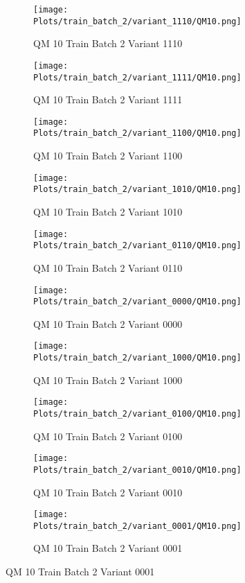\documentclass{DissertateFigs}
\begin{document}
\begin{figure}[t!]
    \begin{subfigure}{0.47\textwidth}
    \texttt{[image: Plots/train\_batch\_2/variant\_1110/QM10.png]}
    \caption{QM 10 Train Batch 2 Variant 1110}
    \end{subfigure}
    \begin{subfigure}{0.47\textwidth}
    \texttt{[image: Plots/train\_batch\_2/variant\_1111/QM10.png]}
    \caption{QM 10 Train Batch 2 Variant 1111}
    \end{subfigure}

\medskip

    \begin{subfigure}{0.47\textwidth}
    \texttt{[image: Plots/train\_batch\_2/variant\_1100/QM10.png]}
    \caption{QM 10 Train Batch 2 Variant 1100}
    \end{subfigure}
    \begin{subfigure}{0.47\textwidth}
    \texttt{[image: Plots/train\_batch\_2/variant\_1010/QM10.png]}
    \caption{QM 10 Train Batch 2 Variant 1010}
    \end{subfigure}

\medskip

    \begin{subfigure}{0.47\textwidth}
    \texttt{[image: Plots/train\_batch\_2/variant\_0110/QM10.png]}
    \caption{QM 10 Train Batch 2 Variant 0110}
    \end{subfigure}
    \begin{subfigure}{0.47\textwidth}
    \texttt{[image: Plots/train\_batch\_2/variant\_0000/QM10.png]}
    \caption{QM 10 Train Batch 2 Variant 0000}
    \end{subfigure}

\medskip

    \begin{subfigure}{0.47\textwidth}
    \texttt{[image: Plots/train\_batch\_2/variant\_1000/QM10.png]}
    \caption{QM 10 Train Batch 2 Variant 1000}
    \end{subfigure}
    \begin{subfigure}{0.47\textwidth}
    \texttt{[image: Plots/train\_batch\_2/variant\_0100/QM10.png]}
    \caption{QM 10 Train Batch 2 Variant 0100}
    \end{subfigure}

\medskip

    \begin{subfigure}{0.47\textwidth}
    \texttt{[image: Plots/train\_batch\_2/variant\_0010/QM10.png]}
    \caption{QM 10 Train Batch 2 Variant 0010}
    \end{subfigure}
    \begin{subfigure}{0.47\textwidth}
    \texttt{[image: Plots/train\_batch\_2/variant\_0001/QM10.png]}
    \caption{QM 10 Train Batch 2 Variant 0001}
    \end{subfigure}


\end{figure}
\end{document}
